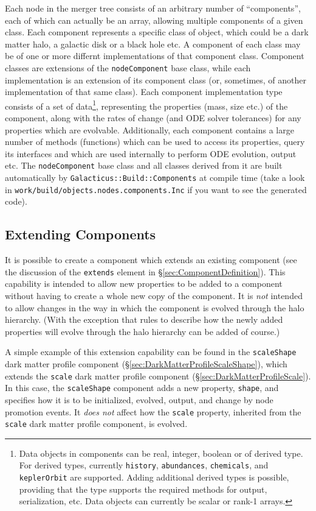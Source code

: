 Each node in the merger tree consists of an arbitrary number of ``components'', each of which can actually be an array, allowing multiple components of a given class. Each component represents a specific class of object, which could be a dark matter halo, a galactic disk or a black hole etc. A component of each class may be of one or more differnt implementations of that component class. Component classes are extensions of the {\tt nodeComponent} base class, while each implementation is an extension of its component class (or, sometimes, of another implementation of that same class). Each component implementation type consists of a set of data\footnote{Data objects in components can be real, integer, boolean or of derived type. For derived types, currently {\tt history}, {\tt abundances}, {\tt chemicals}, and {\tt keplerOrbit} are supported. Adding additional derived types is possible, providing that the type supports the required methods for output, serialization, etc. Data objects can currently be scalar or rank-1 arrays.}, representing the properties (mass, size etc.) of the component, along with the rates of change (and ODE solver tolerances) for any properties which are evolvable. Additionally, each component contains a large number of methods (functions) which can be used to access its properties, query its interfaces and which are used internally to perform ODE evolution, output etc. The {\tt nodeComponent} base class and all classes derived from it are built automatically by {\tt Galacticus::Build::Components} at compile time (take a look in {\tt work/build/objects.nodes.components.Inc} if you want to see the generated code).

\subsection{Extending Components}

It is possible to create a component which extends an existing component (see the discussion of the {\tt extends} element in \S\ref{sec:ComponentDefinition}). This capability is intended to allow new properties to be added to a component without having to create a whole new copy of the component. It is \emph{not} intended to allow changes in the way in which the component is evolved through the halo hierarchy. (With the exception that rules to describe how the newly added properties will evolve through the halo hierarchy can be added of course.)

A simple example of this extension capability can be found in the {\tt scaleShape} dark matter profile component (\S\ref{sec:DarkMatterProfileScaleShape}), which extends the {\tt scale} dark matter profile component (\S\ref{sec:DarkMatterProfileScale}). In this case, the {\tt scaleShape} component adds a new property, {\tt shape}, and specifies how it is to be initialized, evolved, output, and change by node promotion events. It \emph{does not} affect how the {\tt scale} property, inherited from the {\tt scale} dark matter profile component, is evolved.

